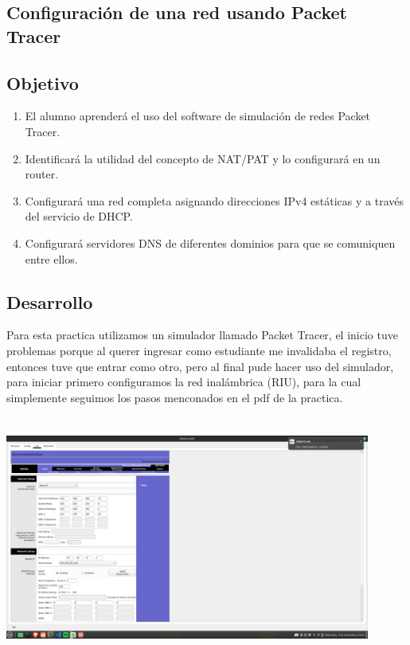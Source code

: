\documentclass[14pt]{book}
\begin{document}
{\color{red} \subsection*{\textbf{Configuración de una red usando Packet Tracer}}}
\vspace{1em}

{\color{red} \subsection*{\textbf{Objetivo}}}
\vspace{1em}

\begin{enumerate}
  \item El alumno aprenderá el uso del software de simulación de redes Packet Tracer.
  \item Identificará la utilidad del concepto de NAT/PAT y lo configurará en un router.
  \item Configurará una red completa asignando direcciones IPv4 estáticas y a través del servicio de DHCP.
  \item Configurará servidores DNS de diferentes dominios para que se comuniquen entre ellos.
\end{enumerate}

\vspace{2em}

{\color{red} \subsection*{\textbf{Desarrollo}}}
\vspace{1em}

Para esta practica utilizamos un simulador llamado Packet Tracer, el inicio tuve problemas porque al querer ingresar como estudiante me invalidaba el registro, entonces tuve que entrar como otro, pero al final pude
hacer uso del simulador, para iniciar primero configuramos la red inalámbrica (RIU), para la cual simplemente seguimos los pasos menconados en el pdf de la
practica.

\includegraphics[width=12cm, height=8cm]{images/ima1.png} 
\end{document}
